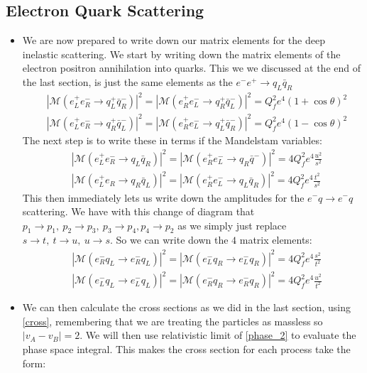 \documentclass[11pt]{article}
\numberwithin{equation}{section}
\begin{document}
\subsection{Electron Quark Scattering} %
\label{sub:electron_quark_scattering}
\begin{itemize}
    \item We are now prepared to write down our matrix elements for the deep inelastic scattering. We start by writing down the matrix elements of the electron positron annihilation into quarks. This we we discussed at the end of the last section, is just the same elements as the $e^-e^+ \rightarrow q_L\bar{q}_R$
    \begin{align*}
    &|\mathcal{M}\left(e_L^+e_R^- \rightarrow q_L^+\bar{q}_R^-\right)|^2 = |\mathcal{M}\left(e_R^+e_L^- \rightarrow q_R^+\bar{q}_L^-\right)|^2 = Q_f^2e^4(1+\cos \theta)^2 \\
        &|\mathcal{M}\left(e_L^+e_R^- \rightarrow q_R^+\bar{q}_L^-\right)|^2 =|\mathcal{M}\left(e_R^+e_L^- \rightarrow q_L^+\bar{q}_R^-\right)|^2= Q_f^2e^4(1-\cos \theta)^2 
     \end{align*}
     The next step is to write these in terms if the Mandelstam variables: 
          \begin{align*}
    &|\mathcal{M}\left(e_L^+e_R^- \rightarrow q_L\bar{q}_R\right)|^2 =|\mathcal{M}\left(e_R^+e_L^- \rightarrow q_R\bar{q}^-\right)|^2=  4Q_f^2e^4\frac{u^2}{s^2} \\
        &|\mathcal{M}\left(e_L^+e_R \rightarrow q_R\bar{q}_L\right)|^2 =|\mathcal{M}\left(e_R^+e_L^- \rightarrow q_L\bar{q}_R\right)|^2  = 4Q_f^2e^4\frac{t^2}{s^2} 
     \end{align*}
     This then immediately lets us write down the amplitudes for the $e^-q \rightarrow e^-q$ scattering. We have with this change of diagram that $p_1 \rightarrow p_1,~p_2\rightarrow p_3,~ p_3\rightarrow p_4, p_4 \rightarrow p_2$ as we simply just replace $s \rightarrow t,~t \rightarrow u,~u\rightarrow s$.  So we can write down the $4$ matrix elements:
     \begin{align*} 
    &|\mathcal{M}\left(e_R^-q_L \rightarrow e_R^-q_L\right)|^2 =|\mathcal{M}\left(e_L^-q_R \rightarrow e_L^-q_R\right)|^2=  4Q_f^2e^4\frac{s^2}{t^2} \\
        &|\mathcal{M}\left(e_L^-q_L \rightarrow e_L^-q_L\right)|^2 =|\mathcal{M}\left(e_R^-q_R \rightarrow e_R^-q_R\right)|^2  = 4Q_f^2e^4\frac{u^2}{t^2} 
     \end{align*}
     \item We can then calculate the cross sections as we did in the last section, using \ref{cross}, remembering that we are treating the particles as massless so $|v_A-v_B|=2$. We will then use relativistic limit of \ref{phase_2} to evaluate the phase space integral. This makes the cross section for each process take the form:

\end{itemize}
\end{document}
